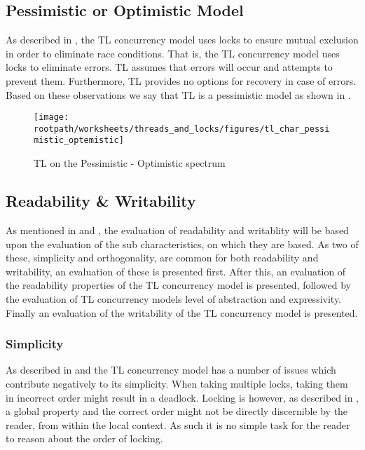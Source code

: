 \subsection{Pessimistic or Optimistic Model}
As described in , the \ac{TL} concurrency model uses locks to ensure mutual exclusion in order to eliminate race conditions. That is, the \ac{TL} concurrency model uses locks to eliminate errors. \ac{TL} assumes that errors will occur and attempts to prevent them. Furthermore, \ac{TL} provides no options for recovery in case of errors. Based on these observations we say that \ac{TL} is a pessimistic model as shown in .

\begin{figure}[htbp]
\centering
 \texttt{[image: \\rootpath/worksheets/threads\_and\_locks/figures/tl\_char\_pessimistic\_optemistic]} 
 \caption{\ac{TL} on the Pessimistic - Optimistic spectrum}
\label{fig:char_pes_opti}
\end{figure}

\subsection{Readability \& Writability}\label{subsec:tl_charac_read_and_write}
As mentioned in  and , the evaluation of readability and writablity will be based upon the evaluation of the sub characteristics, on which they are based. As two of these, simplicity and orthogonality, are common for both readability and writability, an evaluation of these is presented first. After this, an evaluation of the readability properties of the \ac{TL} concurrency model is presented, followed by the evaluation of \ac{TL} concurrency models level of abstraction and expressivity. Finally an evaluation of the writability of the \ac{TL} concurrency model is presented.

\subsubsection{Simplicity}\label{subsec:tl_simplicity_read}
As described in  and  the \ac{TL} concurrency model has a number of issues which contribute negatively to its simplicity. When taking multiple locks, taking them in incorrect order might result in a deadlock. Locking is however, as described in , a global property and the correct order might not be directly discernible by the reader, from within the local context. As such it is no simple task for the reader to reason about the order of locking.

